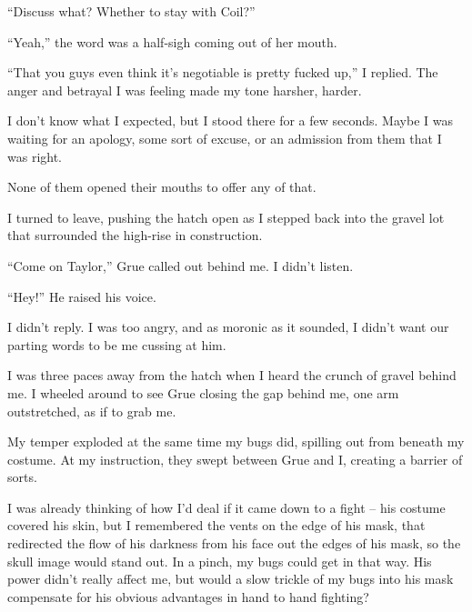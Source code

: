 ``Discuss what?  Whether to stay with Coil?''



``Yeah,'' the word was a half-sigh coming out of her mouth.



``That you guys even think it's negotiable is pretty fucked up,'' I replied.  The anger and betrayal I was feeling made my tone harsher, harder.



I don't know what I expected, but I stood there for a few seconds.  Maybe I was waiting for an apology, some sort of excuse, or an admission from them that I was right.



None of them opened their mouths to offer any of that.



I turned to leave, pushing the hatch open as I stepped back into the gravel lot that surrounded the high-rise in construction.



``Come on Taylor,'' Grue called out behind me.  I didn't listen.



``Hey!'' He raised his voice.



I didn't reply.  I was too angry, and as moronic as it sounded, I didn't want our parting words to be me cussing at him.



I was three paces away from the hatch when I heard the crunch of gravel behind me.  I wheeled around to see Grue closing the gap behind me, one arm outstretched, as if to grab me.



My temper exploded at the same time my bugs did, spilling out from beneath my costume.  At my instruction, they swept between Grue and I, creating a barrier of sorts.



I was already thinking of how I'd deal if it came down to a fight – his costume covered his skin, but I remembered the vents on the edge of his mask, that redirected the flow of his darkness from his face out the edges of his mask, so the skull image would stand out.  In a pinch, my bugs could get in that way.  His power didn't really affect me, but would a slow trickle of my bugs into his mask compensate for his obvious advantages in hand to hand fighting?



